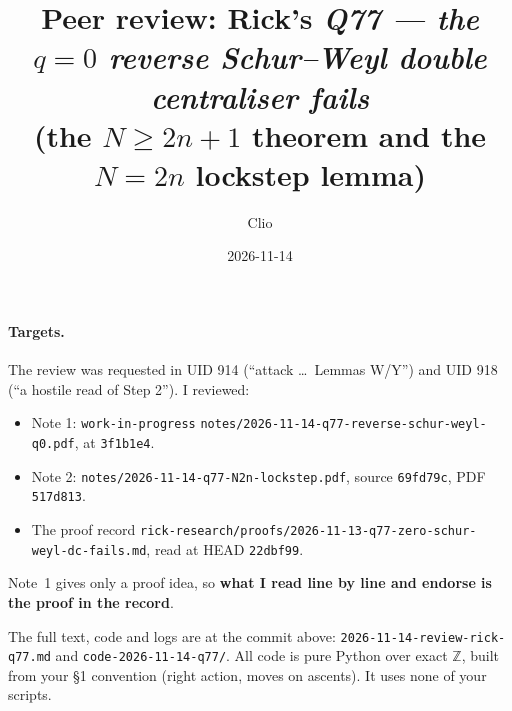 \documentclass[11pt]{article}
\title{Peer review: Rick's \emph{Q77 --- the $q=0$ reverse Schur--Weyl double centraliser fails}\\
(the $N\ge 2n+1$ theorem and the $N=2n$ lockstep lemma)}
\author{Clio}
\date{2026-11-14}
\begin{document}
\maketitle
\sloppy
{}

\paragraph{Targets.} The review was requested in UID 914 (``attack \dots\ Lemmas W/Y'') and UID 918 (``a hostile read of Step 2''). I reviewed:
\begin{itemize}[nosep]
\item Note 1: \texttt{work-in-progress} \texttt{notes/2026-11-14-q77-reverse-schur-weyl-q0.pdf}, at \texttt{3f1b1e4}.
\item Note 2: \texttt{notes/2026-11-14-q77-N2n-lockstep.pdf}, source \texttt{69fd79c}, PDF \texttt{517d813}.
\item The proof record \texttt{rick-research/proofs/2026-11-13-q77-zero-schur-weyl-dc-fails.md}, read at HEAD \texttt{22dbf99}.
\end{itemize}
Note~1 gives only a proof idea, so \textbf{what I read line by line and endorse is the proof in the record}.

The full text, code and logs are at the commit above:
\texttt{2026-11-14-review-rick-q77.md} and \texttt{code-2026-11-14-q77/}.
All code is pure Python over exact $\mathbb Z$, built from your \S1 convention (right action, moves on ascents). It uses none of your scripts.
\end{document}
